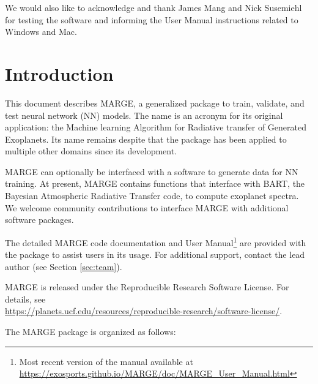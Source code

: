 \documentclass[letterpaper, 12pt]{article}
\begin{document}
\noindent We would also like to acknowledge and thank James Mang and 
Nick Susemiehl for testing the software and informing the User Manual 
instructions related to Windows and Mac.

\section{Introduction}
\label{sec:theory}

\noindent This document describes MARGE, a generalized package to train, 
validate, and test neural network (NN) models.  The name is an acronym for its 
original application: the Machine learning Algorithm for Radiative transfer of 
Generated Exoplanets.  Its name remains despite that the package has been 
applied to multiple other domains since its development.

MARGE can optionally be interfaced with a software to generate data for NN 
training.  At present, MARGE contains functions that interface with BART, 
the Bayesian Atmospheric Radiative Transfer code, to compute exoplanet 
spectra.  We welcome community contributions to interface MARGE with 
additional software packages.

The detailed MARGE code documentation and User Manual\footnote{Most recent version of the manual available at 
\href{https://exosports.github.io/MARGE/doc/MARGE_User_Manual.html}{https://exosports.github.io/MARGE/doc/MARGE\_User\_Manual.html}} 
are provided with the package to assist users in its usage. 
For additional support, contact the lead author (see Section \ref{sec:team}).

MARGE is released under the Reproducible Research Software License.  
For details, see \\
\href{https://planets.ucf.edu/resources/reproducible-research/software-license/}{https://planets.ucf.edu/resources/reproducible-research/software-license/}.
\newline

\noindent The MARGE package is organized as follows: \newline
\noindent{}
\vspace{0.7cm}
\end{document}
